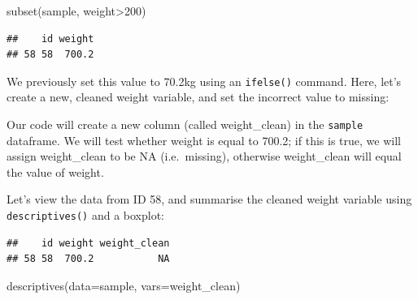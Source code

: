 \documentclass[
]{memoir}
\newenvironment{Shaded}{\begin{snugshade}}{\end{snugshade}}
\newcommand{\AttributeTok}[1]{\textcolor[rgb]{0.77,0.63,0.00}{#1}}
\newcommand{\ConstantTok}[1]{\textcolor[rgb]{0.00,0.00,0.00}{#1}}
\newcommand{\DecValTok}[1]{\textcolor[rgb]{0.00,0.00,0.81}{#1}}
\newcommand{\FloatTok}[1]{\textcolor[rgb]{0.00,0.00,0.81}{#1}}
\newcommand{\FunctionTok}[1]{\textcolor[rgb]{0.00,0.00,0.00}{#1}}
\newcommand{\NormalTok}[1]{#1}
\newcommand{\OtherTok}[1]{\textcolor[rgb]{0.56,0.35,0.01}{#1}}
\newcommand{\SpecialCharTok}[1]{\textcolor[rgb]{0.00,0.00,0.00}{#1}}
\begin{document}
\begin{Shaded}
\begin{Highlighting}[]
\FunctionTok{subset}\NormalTok{(sample, weight}\SpecialCharTok{\textgreater{}}\DecValTok{200}\NormalTok{)}
\end{Highlighting}
\end{Shaded}

\begin{verbatim}
##    id weight
## 58 58  700.2
\end{verbatim}

We previously set this value to 70.2kg using an \texttt{ifelse()} command. Here, let's create a new, cleaned weight variable, and set the incorrect value to missing:

\begin{Shaded}
\end{Shaded}

Our code will create a new column (called weight\_clean) in the \texttt{sample} dataframe. We will test whether weight is equal to 700.2; if this is true, we will assign weight\_clean to be NA (i.e.~missing), otherwise weight\_clean will equal the value of weight.

Let's view the data from ID 58, and summarise the cleaned weight variable using \texttt{descriptives()} and a boxplot:

\begin{Shaded}
\end{Shaded}

\begin{verbatim}
##    id weight weight_clean
## 58 58  700.2           NA
\end{verbatim}

\begin{Shaded}
\begin{Highlighting}[]
\FunctionTok{descriptives}\NormalTok{(}\AttributeTok{data=}\NormalTok{sample, }\AttributeTok{vars=}\NormalTok{weight\_clean)}
\end{Highlighting}
\end{Shaded}
\end{document}
